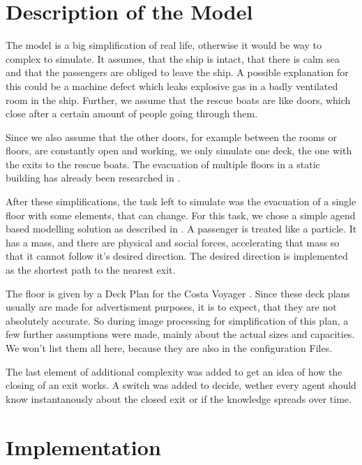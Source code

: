 \documentclass[11pt]{article}
\begin{document}
\section{Description of the Model}

The model is a big simplification of real life, otherwise it would be way to complex to simulate.
It assumes, that the ship is intact, that there is calm sea and that the passengers are obliged to leave the ship. 
A possible explanation for this could be a machine defect which leaks explosive gas in a badly ventilated room in the ship. Further, we assume that the rescue boats are like doors, which close after a certain amount of people going through them. 

Since we also assume that the other doors, for example between the rooms or floors, are constantly open and working, we only simulate one deck, the one with the exits to the rescue boats.
The evacuation of multiple floors in a static building has already been researched in \cite{multilevel}. 

After these simplifications, the task left to simulate was the evacuation of a single floor with some elements, that can change.
For this task, we chose a simple agend based modelling solution as described in \cite{helbing}.
A passenger is treated like a particle. It has a mass, and there are physical and social forces, accelerating that mass so that it cannot follow it's desired direction.
The desired direction is implemented as the shortest path to the nearest exit.

The floor is given by a Deck Plan for the Costa Voyager \cite{costa}. Since these deck plans usually are made for advertisment purposes, it is to expect, that they are not absolutely accurate.
So during image processing for simplification of this plan, a few further assumptions were made, mainly about the actual sizes and capacities. 
We won't list them all here, because they are also in the configuration Files. 

The last element of additional complexity was added to get an idea of how the closing of an exit works. 
A switch was added to decide, wether every agent should know instantanously about the closed exit or if the knowledge spreads over time.

\section{Implementation}
\end{document}
